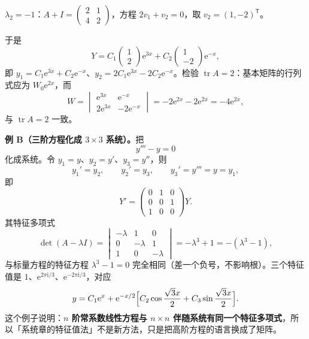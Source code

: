 \documentclass[11pt]{ctexart}
\newcommand{\tr}{\operatorname{tr}}
\newcommand{\ii}{\mathrm{i}}
\newcommand{\ee}{\mathrm{e}}
\begin{document}
$\lambda_2=-1$：$A+I=\begin{pmatrix}2&1\\4&2\end{pmatrix}$，方程 $2v_1+v_2=0$，取 $v_2=(1,-2)^{\mathsf T}$。

于是
\[
Y=C_1\begin{pmatrix}1\\2\end{pmatrix}\ee^{3x}+C_2\begin{pmatrix}1\\-2\end{pmatrix}\ee^{-x},
\]
即 $y_1=C_1\ee^{3x}+C_2\ee^{-x}$、$y_2=2C_1\ee^{3x}-2C_2\ee^{-x}$。检验 $\tr A=2$：基本矩阵的行列式应为 $W_0\ee^{2x}$，而
\[
W=\begin{vmatrix}\ee^{3x}&\ee^{-x}\\2\ee^{3x}&-2\ee^{-x}\end{vmatrix}
=-2\ee^{2x}-2\ee^{2x}=-4\ee^{2x},
\]
与 $\tr A=2$ 一致。

\textbf{例 B（三阶方程化成 $3\times3$ 系统）。}把
\[
y'''-y=0
\]
化成系统。令 $y_1=y$、$y_2=y'$、$y_3=y''$，则
\[
y_1'=y_2,\qquad y_2'=y_3,\qquad y_3'=y'''=y=y_1,
\]
即
\[
Y'=\begin{pmatrix}0&1&0\\0&0&1\\1&0&0\end{pmatrix}Y .
\]
其特征多项式
\[
\det(A-\lambda I)=\begin{vmatrix}-\lambda&1&0\\0&-\lambda&1\\1&0&-\lambda\end{vmatrix}
=-\lambda^3+1=-(\lambda^3-1),
\]
与标量方程的特征方程 $\lambda^3-1=0$ 完全相同（差一个负号，不影响根）。三个特征值是 $1$、$\ee^{2\pi\ii/3}$、$\ee^{-2\pi\ii/3}$，对应
\[
y=C_1\ee^x+\ee^{-x/2}\Bigl[C_2\cos\frac{\sqrt3x}{2}+C_3\sin\frac{\sqrt3x}{2}\Bigr].
\]
这个例子说明：\textbf{$n$ 阶常系数线性方程与 $n\times n$ 伴随系统有同一个特征多项式}，所以「系统章的特征值法」不是新方法，只是把高阶方程的语言换成了矩阵。


\end{document}
